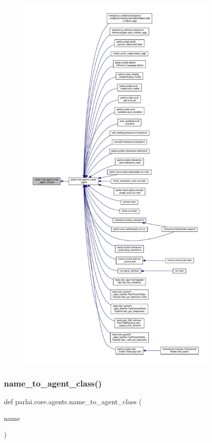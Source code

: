 \begin{figure}[H]
\begin{center}
\leavevmode
\includegraphics[height=550pt]{namespaceparlai_1_1core_1_1agents_a213df46dd21144eb4c056bb58c294c5d_icgraph}
\end{center}
\end{figure}
\mbox{\label{namespaceparlai_1_1core_1_1agents_a7a5f5076b35ce376d8b46bfb362bfc53}} 
\subsubsection{\texorpdfstring{name\+\_\+to\+\_\+agent\+\_\+class()}{name\_to\_agent\_class()}}
{\footnotesize\ttfamily def parlai.\+core.\+agents.\+name\+\_\+to\+\_\+agent\+\_\+class (\begin{DoxyParamCaption}\item[{}]{name }\end{DoxyParamCaption})}

